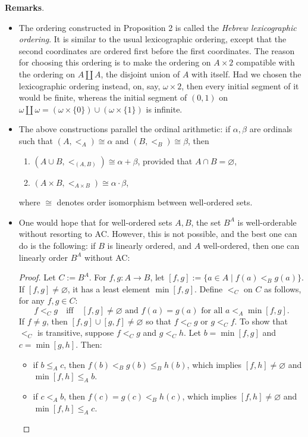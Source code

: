 \documentclass[12pt]{article}
\begin{document}
\textbf{Remarks}.
\begin{itemize}
\item
The ordering constructed in Proposition 2 is called the \emph{Hebrew lexicographic ordering}.  It is similar to the usual lexicographic ordering, except that the second coordinates are ordered first before the first coordinates.  The reason for choosing this ordering is to make the ordering on $A\times 2$ compatible with the ordering on $A \coprod A$, the disjoint union of $A$ with itself.  Had we chosen the lexicographic ordering instead, on, say, $\omega \times 2$, then every initial segment of it would be finite, whereas the initial segment of $(0,1)$ on $\omega \coprod \omega = (\omega \times \lbrace 0\rbrace) \cup (\omega \times \lbrace 1\rbrace)$ is infinite.
\item
The above constructions parallel the ordinal arithmetic: if $\alpha,\beta$ are ordinals such that $(A,<_A)\cong \alpha$ and $(B,<_B)\cong \beta$, then
\begin{enumerate}
\item $(A\cup B,<_{(A,B)})\cong \alpha+\beta$, provided that $A\cap B=\varnothing$,
\item $(A\times B,<_{A\times B}) \cong \alpha\cdot \beta$,
\end{enumerate}
where $\cong$ denotes order isomorphism between well-ordered sets.
\item
One would hope that for well-ordered sets $A,B$, the set $B^A$ is well-orderable without resorting to AC.  However, this is not possible, and the best one can do is the following: if $B$ is linearly ordered, and $A$ well-ordered, then one can linearly order $B^A$ without AC:
\begin{proof}  Let $C:=B^A$.  For $f,g: A\to B$, let $[f,g]:=\lbrace a\in A\mid f(a)<_B g(a)\rbrace$.  If $[f,g]\ne \varnothing$, it has a least element $\min[f,g]$.  Define $<_C$ on $C$ as follows, for any $f,g\in C$: 
$$f <_C g \quad \mbox{iff} \quad [f,g]\ne \varnothing \mbox{ and } f(a)= g(a)\mbox{ for all }a <_A \min[f,g].$$
If $f\ne g$, then $[f,g]\cup [g,f]\ne \varnothing$ so that $f <_C g$ or $g <_C f$.  
To show that $<_C$ is transitive, suppose $f <_C g$ and $g <_C h$.  Let $b=\min[f,g]$ and $c=\min[g,h]$.  Then:
\begin{itemize}
\item if $b \le_A c$, then $f(b)<_B g(b) \le_B h(b)$, which implies $[f,h]\ne \varnothing$ and $\min[f,h]\le_A b$.  
\item if $c <_A b$, then $f(c) = g(c) <_B h(c)$, which implies $[f,h]\ne\varnothing$ and $\min[f,h]\le_A c$.

\end{itemize}
\end{proof}
\end{itemize}
\end{document}
